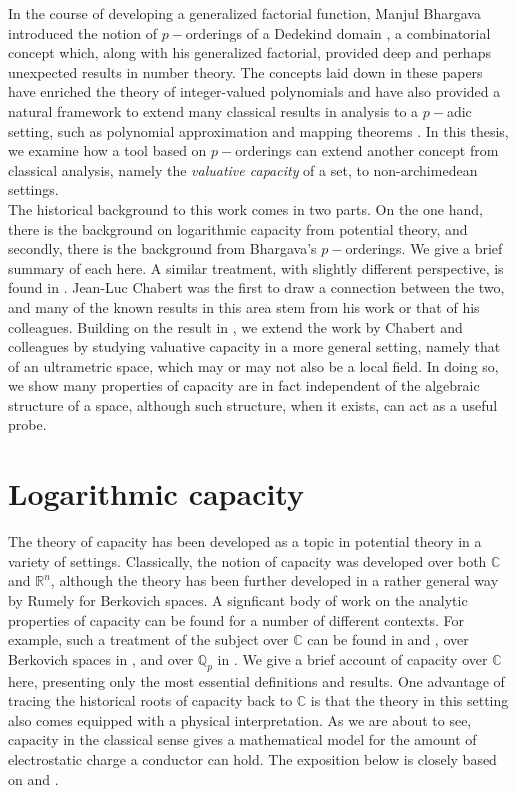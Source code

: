 
In the course of developing a generalized factorial function, Manjul Bhargava introduced the notion of $p-$orderings of a Dedekind domain \cite{mb1, mb2}, a combinatorial concept which, along with his generalized factorial, provided deep and perhaps unexpected results in number theory. The concepts laid down in these papers have enriched the theory of integer-valued polynomials \cite{mb3, kj2} and have also provided a natural framework to extend many classical results in analysis to a $p-$adic setting, such as polynomial approximation and mapping theorems \cite{mb1, mb2,mb3}. In this thesis, we examine how a tool based on $p-$orderings can extend another concept from classical analysis, namely the \textit{valuative capacity} of a set, to non-archimedean settings.\\

The historical background to this work comes in two parts. On the one hand, there is the background on logarithmic capacity from potential theory, and secondly, there is the background from Bhargava's $p-$orderings. We give a brief summary of each here. A similar treatment, with slightly different perspective, is found in \cite{fp}. Jean-Luc Chabert was the first to draw a connection between the two, and many of the known results in this area stem from his work or that of his colleagues. Building on the result in \cite{kj}, we extend the work by Chabert and colleagues by studying valuative capacity in a more general setting, namely that of an ultrametric space, which may or may not also be a local field. In doing so, we show many properties of capacity are in fact independent of the algebraic structure of a space, although such structure, when it exists, can act as a useful probe.\\

\section{Logarithmic capacity}
The theory of capacity has been developed as a topic in potential theory in a variety of settings. Classically, the notion of capacity was developed over both $\mathbb{C}$ and $\mathbb{R}^n$, although the theory has been further developed in a rather general way by Rumely for Berkovich spaces. A  signficant body of work on the analytic properties of capacity can be found for a number of different contexts. For example, such a treatment of the subject over $\mathbb{C}$ can be found in \cite{wer} and \cite{rand}, over Berkovich spaces in \cite{rum}, and over $\mathbb{Q}_p$ in \cite{dgc}. We give a brief account of capacity over $\mathbb{C}$ here, presenting only the most essential definitions and results.   One advantage of tracing the historical roots of capacity back to $\mathbb{C}$ is that the theory in this setting also comes equipped with a physical interpretation. As we are about to see, capacity in the classical sense gives a mathematical model for the amount of electrostatic charge a conductor can hold. The exposition below is closely based on \cite{rand} and \cite{rand2}.\\


